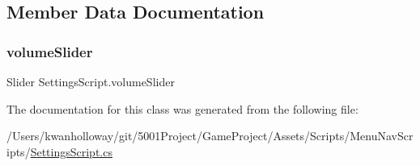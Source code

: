\subsection{Member Data Documentation}
\mbox{\label{class_settings_script_ad08bdea1b11fad7c975f6ec3449c575a}} 
\subsubsection{\texorpdfstring{volume\+Slider}{volumeSlider}}
{\footnotesize\ttfamily Slider Settings\+Script.\+volume\+Slider}



The documentation for this class was generated from the following file\+:\begin{DoxyCompactItemize}
\item 
/\+Users/kwanholloway/git/5001\+Project/\+Game\+Project/\+Assets/\+Scripts/\+Menu\+Nav\+Scripts/\hyperlink{_settings_script_8cs}{Settings\+Script.\+cs}\end{DoxyCompactItemize}
